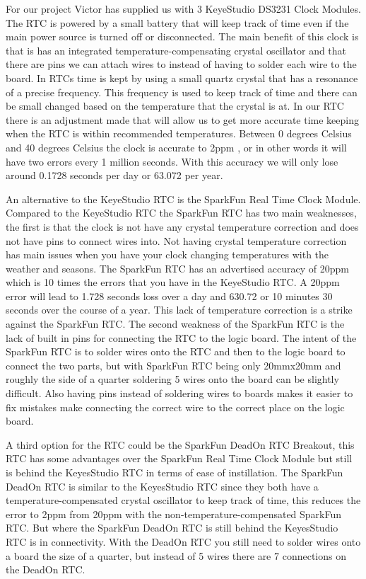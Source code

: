 \documentclass[onecolumn, draftclsnofoot,10pt, compsoc]{IEEEtran}
\begin{document}
For our project Victor has supplied us with 3 KeyeStudio DS3231 Clock Modules.
The RTC is powered by a small battery that will keep track of time even if the main power source is turned off or disconnected.
The main benefit of this clock is that is has an integrated temperature-compensating crystal oscillator and that there are pins we can attach wires to instead of having to solder each wire to the board.
In RTCs time is kept by using a small quartz crystal that has a resonance of a precise frequency.
This frequency is used to keep track of time and there can be small changed based on the temperature that the crystal is at.
In our RTC there is an adjustment made that will allow us to get more accurate time keeping when the RTC is within recommended temperatures.
Between 0 degrees Celsius and 40 degrees Celsius the clock is accurate to 2ppm \cite{ksRTC}, or in other words it will have two errors every 1 million seconds.
With this accuracy we will only lose around 0.1728 seconds per day or 63.072 per year.

An alternative to the KeyeStudio RTC is the SparkFun Real Time Clock Module.
Compared to the KeyeStudio RTC the SparkFun RTC has two main weaknesses, the first is that the clock is not have any crystal temperature correction and does not have pins to connect wires into.
Not having crystal temperature correction has main issues when you have your clock changing temperatures with the weather and seasons.
The SparkFun RTC has an advertised accuracy of 20ppm which is 10 times the errors that you have in the KeyeStudio RTC.
A 20ppm error will lead to 1.728 seconds loss over a day and 630.72 or 10 minutes 30 seconds over the course of a year.
This lack of temperature correction is a strike against the SparkFun RTC.
The second weakness of the SparkFun RTC is the lack of built in pins for connecting the RTC to the logic board.
The intent of the SparkFun RTC is to solder wires onto the RTC and then to the logic board to connect the two parts, but with SparkFun RTC being only 20mmx20mm and roughly the side of a quarter \cite{sfRTC} soldering 5 wires onto the board can be slightly difficult.
Also having pins instead of soldering wires to boards makes it easier to fix mistakes make connecting the correct wire to the correct place on the logic board.

A third option for the RTC could be the SparkFun DeadOn RTC Breakout, this RTC has some advantages over the SparkFun Real Time Clock Module but still is behind the KeyesStudio RTC in terms of ease of instillation.
The SparkFun DeadOn RTC is similar to the KeyesStudio RTC since they both have a temperature-compensated crystal oscillator to keep track of time, this reduces the error to 2ppm \cite{sfDeadOn} from 20ppm with the non-temperature-compensated SparkFun RTC.
But where the SparkFun DeadOn RTC is still behind the KeyesStudio RTC is in connectivity.
With the DeadOn RTC you still need to solder wires onto a board the size of a quarter, but instead of 5 wires there are 7 connections on the DeadOn RTC.
\end{document}
